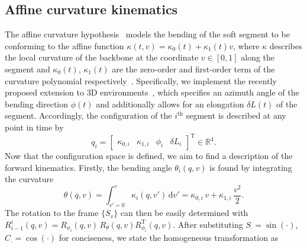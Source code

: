 \subsection{Affine curvature kinematics}\label{sub:promasens:kinematic_model_ac}
The affine curvature hypothesis~\cite{della2020soft, stella2022piecewise_preprint} models the bending of the soft segment to be conforming to the affine function $\kappa(t,v) = \kappa_0(t) + \kappa_1(t) v$, where $\kappa$ describes the local curvature of the backbone at the coordinate $v \in [0, 1]$ along the segment and $\kappa_0(t)$, $\kappa_1(t)$ are the zero-order and first-order term of the curvature polynomial respectively~\cite{della2019control}.
Specifically, we implement the recently proposed extension to 3D environments~\cite{stella2022piecewise_preprint}, which specifies an azimuth angle of the bending direction $\phi(t)$ and additionally allows for an elongation $\delta L(t)$ of the segment.
Accordingly, the configuration of the $i^\mathrm{th}$ segment is described at any point in time by
\begin{equation}
    q_i = \begin{bmatrix}\kappa_{0,i} & \kappa_{1,i} & \phi_i & \delta L_{i} \end{bmatrix}^{\mathrm{T}} \in \mathbb{R}^4.
\end{equation}
Now that the configuration space is defined, we aim to find a description of the forward kinematics. Firstly, the bending angle $\theta_i(q, v)$ is found by integrating the curvature
\begin{equation}
    \theta(q,v) = \int_{v'=0}^{v} \kappa_i(q, v') \, \mathrm{d}v' = \kappa_{0,i} \, v + \kappa_{1,i} \, \frac{v^2}{2}.
\end{equation}
The rotation to the frame $\{S_{v}\}$ can then be easily determined with $R_{i-1}^{i}(q,v) = R_{\phi_i}(q,v) \, R_{\theta}(q,v) R_{\phi_i}^\mathrm{T}(q,v)$. After substituting $S_{\cdot} = \sin(\cdot)$, $C_{\cdot} = \cos(\cdot)$ for conciseness, we state the homogeneous transformation as
